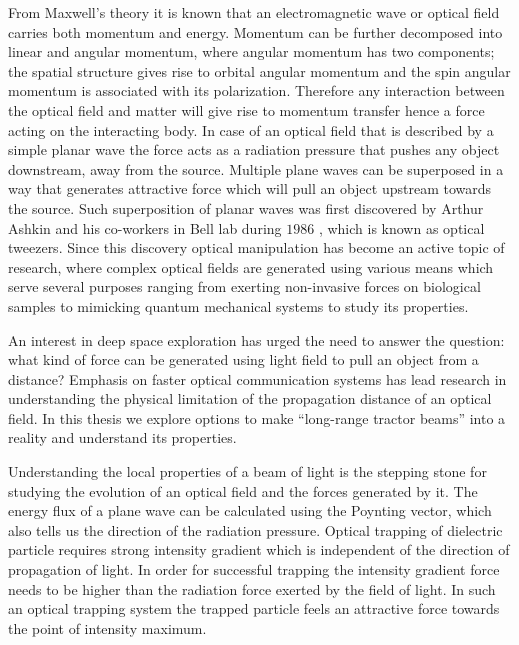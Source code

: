 From Maxwell's theory it is known that an electromagnetic wave or optical field carries both momentum and energy. Momentum can be further decomposed into linear and angular momentum, where angular momentum has two components; the spatial structure gives rise to orbital angular momentum \cite{Yao2011} and the spin angular momentum is associated with its polarization. Therefore any interaction between the optical field and matter will give rise to momentum transfer hence a force acting on the interacting body. In case of an optical field that is described by a simple planar wave the force acts as a radiation pressure that pushes any object downstream, away from the source. Multiple plane waves can be superposed in a way that generates attractive force which will pull an object upstream towards the source. Such superposition of planar waves was first discovered by Arthur Ashkin and his co-workers in Bell lab during $1986$ \cite{beth1936}, which is known as optical tweezers. Since this discovery optical manipulation has become an active topic of research, where complex optical fields are generated using various means which serve several purposes ranging from exerting non-invasive forces on biological samples to mimicking quantum mechanical systems to study its properties.

An interest in deep space exploration has urged the need to answer the question: what kind of force can be generated using light field to pull an object from a distance? Emphasis on faster optical communication systems has lead research in understanding the physical limitation of the propagation distance of an optical field. In this thesis we explore options to make ``long-range tractor beams'' into a reality and understand its properties.

Understanding the local properties of a beam of light is the stepping stone for studying the evolution of an optical field and the forces generated by it. The energy flux of a plane wave can be calculated using the Poynting vector, which also tells us the direction of the radiation pressure. Optical trapping of dielectric particle requires strong intensity gradient which is independent of the direction of propagation of light. In order for successful trapping the intensity gradient force needs to be higher than the radiation force exerted by the field of light. In such an optical trapping system the trapped particle feels an attractive force towards the point of intensity maximum.

